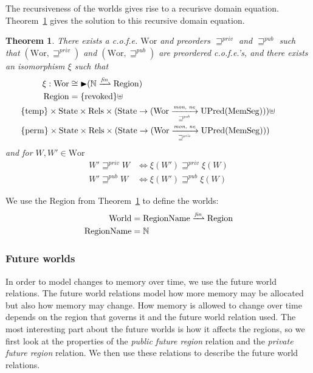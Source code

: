 \documentclass[compsoc,conference,letterpaper,fleqn]{IEEEtran}
\newtheorem{theorem}{Theorem}
\newcommand{\finparfun}{\xrightharpoonup{\textit{\tiny{fin}}}}
\newcommand{\fun}{\rightarrow}
\newcommand{\blater}{\mathop{\blacktriangleright}}
\newcommand{\cofe}{c.o.f.e.}
\newcommand{\cofes}{\cofe{}'s}
\newcommand{\var}[1]{\mathit{#1}}
\newcommand{\futurewk}{\mathbin{\sqsupseteq}^{\var{pub}}}
\newcommand{\futurestr}{\mathbin{\sqsupseteq}^{\var{priv}}}
\newcommand{\monwknefun}{\xrightarrow[\text{\tiny{$\futurewk$}}]{\textit{\tiny{mon, ne}}}}
\newcommand{\monstrnefun}{\xrightarrow[\text{\tiny{$\futurestr$}}]{\textit{\tiny{mon, ne}}}}
\newcommand{\plaindom}[1]{\mathrm{#1}}
\newcommand{\HeapSegments}{\plaindom{MemSeg}}
\newcommand{\nats}{\mathbb{N}}
\newcommand{\Rels}{\plaindom{Rels}}
\newcommand{\States}{\plaindom{State}}
\newcommand{\RegionNames}{\plaindom{RegionName}}
\newcommand{\Regions}{\plaindom{Region}}
\newcommand{\Worlds}{\plaindom{World}}
\newcommand{\Wor}{\plaindom{Wor}}
\newcommand{\UPred}[1]{\plaindom{UPred}(#1)}
\newcommand{\plainview}[1]{\mathrm{#1}}
\newcommand{\perma}{\plainview{perm}}
\newcommand{\temp}{\plainview{temp}}
\newcommand{\revoked}{\plainview{revoked}}
\begin{document}
The recursiveness of the worlds gives rise to a recurisve domain
equation. Theorem~\ref{thm:world-existence} gives the solution to this
recursive domain equation.
\begin{theorem}\label{thm:world-existence}
  There exists a \cofe{} $\Wor$ and preorders $\futurestr$ and
  $\futurewk$ such that $(\Wor,\futurestr)$ and $(\Wor,\futurewk)$ are
  preordered \cofes{}, and there exists an isomorphism $\xi$ such that
  {\small
    \begin{align*}              
      \xi : \Wor & \cong \blater (\nats \finparfun \Regions)\\
      \Regions & = \{\revoked\} \uplus \\
                 &\hskip -2cm \{\temp\} \times \States \times \Rels \times (\States \fun (\Wor \monwknefun \UPred{\HeapSegments})) \uplus \\
                 & \hskip -2cm \{\perma\} \times \States \times \Rels \times (\States \fun (\Wor \monstrnefun \UPred{\HeapSegments}))
    \end{align*}
  } and for $W, W' \in \Wor$
  \begin{align*}
    W' \futurestr W & \Leftrightarrow \xi(W') \futurestr \xi(W)   \\
    W' \futurewk W & \Leftrightarrow \xi(W') \futurewk \xi(W)
  \end{align*}
\end{theorem}
We use the $\Regions$ from Theorem~\ref{thm:world-existence} to define
the worlds:
\begin{align*}
  \Worlds & = \RegionNames \finparfun \Regions\\
 \RegionNames & = \nats
\end{align*}

\subsubsection{Future worlds}
In order to model changes to memory over time, we use the future world
relations. The future world relations model how more memory may be
allocated but also how memory may change. How memory is allowed to
change over time depends on the region that governs it and the future
world relation used. The most interesting part about the future worlds
is how it affects the regions, so we first look at the properties of
the \emph{public future region} relation and the \emph{private future
  region} relation. We then use these relations to describe the future
world relations.
\end{document}
